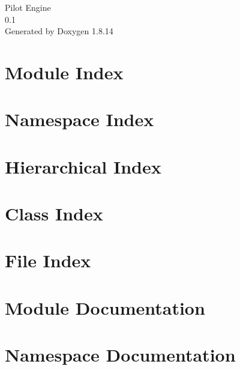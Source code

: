 \documentclass[twoside]{book}
\newcommand{\+}{\discretionary{\mbox{\scriptsize$\hookleftarrow$}}{}{}}
\newcommand{\clearemptydoublepage}{%
  \newpage{\pagestyle{empty}\cleardoublepage}%
}
\begin{document}
\hypersetup{pageanchor=false,
             bookmarksnumbered=true,
             pdfencoding=unicode
            }
\begin{titlepage}
\vspace*{7cm}
\begin{center}%
{\Large Pilot Engine \\[1ex]\large 0.\+1 }\\
\vspace*{1cm}
{\large Generated by Doxygen 1.8.14}\\
\end{center}
\end{titlepage}
\clearemptydoublepage
{}
\tableofcontents
\clearemptydoublepage
{}
\hypersetup{pageanchor=true}

\chapter{Module Index}

\chapter{Namespace Index}

\chapter{Hierarchical Index}

\chapter{Class Index}

\chapter{File Index}

\chapter{Module Documentation}


\chapter{Namespace Documentation}


\end{document}
